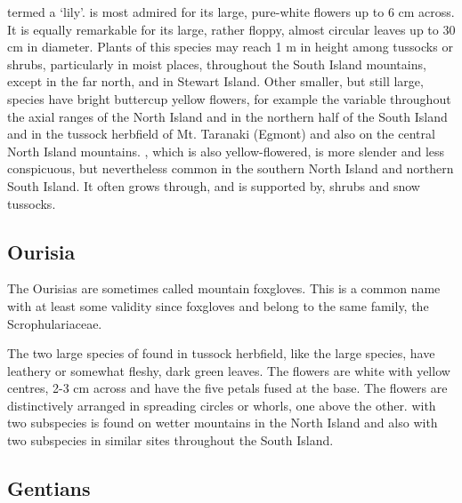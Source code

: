 termed a `lily'.  is most admired for its large, pure-white flowers up to 6 cm across.
It is equally remarkable for its large, rather floppy, almost circular leaves up to 30 cm in diameter.
Plants of this species may reach 1 m in height among tussocks or shrubs, particularly in moist places, throughout the South Island mountains, except in the far north, and in Stewart Island.
Other smaller, but still large, species have bright buttercup yellow flowers, for example the variable  throughout the axial ranges of the North Island and in the northern half of the South Island and  in the tussock herbfield of Mt.
Taranaki (Egmont) and also on the central North Island mountains. , which is also yellow-flowered, is more slender and less conspicuous, but nevertheless common in the southern North Island and northern South Island.
It often grows through, and is supported by, shrubs and snow tussocks.

\subsection{Ourisia}

The Ourisias are sometimes called mountain foxgloves.
This is a common name with at least some validity since foxgloves and  belong to the same family, the Scrophulariaceae.

The two large species of  found in tussock herbfield, like the large  species, have leathery or somewhat fleshy, dark green leaves.
The flowers are white with yellow centres, 2-3 cm across and have the five petals fused at the base.
The flowers are distinctively arranged in spreading circles or whorls, one above the other.  with two subspecies is found on wetter mountains in the North Island and  also with two subspecies in similar sites throughout the South Island.

\subsection{Gentians}

